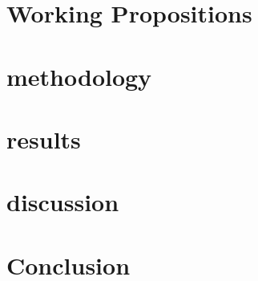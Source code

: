 \chapter{Working Propositions}

\chapter{methodology}

\chapter{results}

\chapter{discussion}

\chapter{Conclusion}
